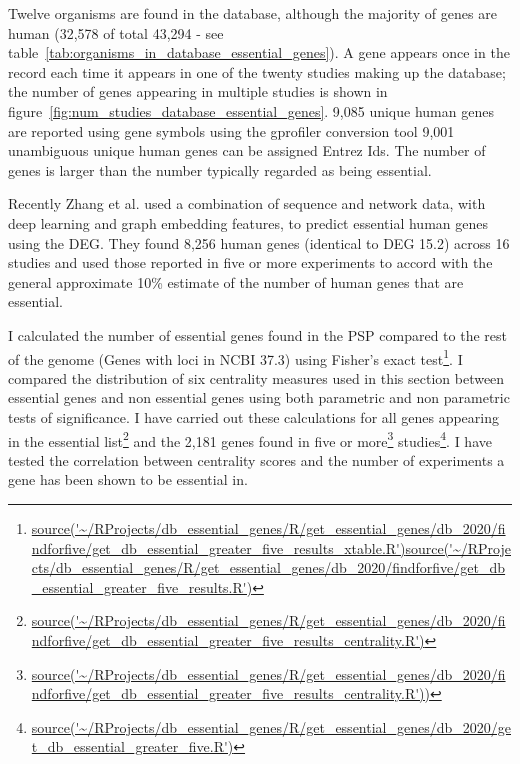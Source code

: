 Twelve organisms are found in the database, although the majority of genes are human (32,578 of total 43,294 - see table~\ref{tab:organisms_in_database_essential_genes}). A gene appears once in the record each time it appears in one of the twenty studies making up the database; the number of genes appearing in multiple studies is shown in figure~\ref{fig:num_studies_database_essential_genes}. 9,085 unique human genes are reported using gene symbols using the gprofiler conversion tool 9,001 unambiguous unique human genes can be assigned Entrez Ids. The number of genes is larger than the number typically regarded as being essential. 
 
 Recently Zhang et al.\cite{zhao2020misuse} used a combination of sequence and network data, with deep learning and graph embedding features, to predict essential human genes using the DEG. They found 8,256 human genes (identical to DEG 15.2) across 16 studies and used those reported in five or more experiments to accord with the general approximate 10\% estimate of the number of human genes that are essential\cite{wang2015identification}. 
 
 
 I calculated the number of essential genes found in the PSP compared to the rest of the genome (Genes with loci in NCBI 37.3) using Fisher's exact test\footnote{\url{source('~/RProjects/db_essential_genes/R/get_essential_genes/db_2020/findforfive/get_db_essential_greater_five_results_xtable.R')}\url{source('~/RProjects/db_essential_genes/R/get_essential_genes/db_2020/findforfive/get_db_essential_greater_five_results.R')}
 }. I compared the distribution of six centrality measures used in this section between essential genes and non essential genes using both parametric and non parametric tests of significance. I have carried out these calculations for all genes appearing in the essential list\footnote{\url{source('~/RProjects/db_essential_genes/R/get_essential_genes/db_2020/findforfive/get_db_essential_greater_five_results_centrality.R')}
 } and the 2,181 genes found in five or more\footnote{\url{source('~/RProjects/db_essential_genes/R/get_essential_genes/db_2020/findforfive/get_db_essential_greater_five_results_centrality.R'))}} studies\footnote{\url{source('~/RProjects/db_essential_genes/R/get_essential_genes/db_2020/get_db_essential_greater_five.R')}}. I have  tested the correlation between centrality scores and the number of experiments a gene has been shown to be essential in.  
 
